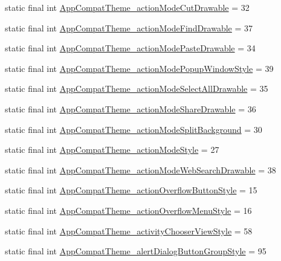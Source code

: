 \begin{CompactItemize}
\item 
static final int \hyperlink{classandroid_1_1support_1_1v4_1_1_r_1_1styleable_ff9fdface004857501db9de7aedb1dd6}{AppCompatTheme\_\-actionModeCutDrawable} = 32
\item 
static final int \hyperlink{classandroid_1_1support_1_1v4_1_1_r_1_1styleable_4c89f9a8ad7b10afd63ffd919b6c656d}{AppCompatTheme\_\-actionModeFindDrawable} = 37
\item 
static final int \hyperlink{classandroid_1_1support_1_1v4_1_1_r_1_1styleable_ce113ab232516420cf074243bfe9453f}{AppCompatTheme\_\-actionModePasteDrawable} = 34
\item 
static final int \hyperlink{classandroid_1_1support_1_1v4_1_1_r_1_1styleable_bcdd14cc5abf52a599a9a9d79cd848bd}{AppCompatTheme\_\-actionModePopupWindowStyle} = 39
\item 
static final int \hyperlink{classandroid_1_1support_1_1v4_1_1_r_1_1styleable_161a3ac1577d6c574603d52de21d3d13}{AppCompatTheme\_\-actionModeSelectAllDrawable} = 35
\item 
static final int \hyperlink{classandroid_1_1support_1_1v4_1_1_r_1_1styleable_5d3af33e63914f57419c77e882cafd0c}{AppCompatTheme\_\-actionModeShareDrawable} = 36
\item 
static final int \hyperlink{classandroid_1_1support_1_1v4_1_1_r_1_1styleable_5e9c280564e789966ff3d14b724504a1}{AppCompatTheme\_\-actionModeSplitBackground} = 30
\item 
static final int \hyperlink{classandroid_1_1support_1_1v4_1_1_r_1_1styleable_7b9d118860f9039d760ed5c14bc0d23c}{AppCompatTheme\_\-actionModeStyle} = 27
\item 
static final int \hyperlink{classandroid_1_1support_1_1v4_1_1_r_1_1styleable_bfa14a297ea509f8f84881a8e67711b1}{AppCompatTheme\_\-actionModeWebSearchDrawable} = 38
\item 
static final int \hyperlink{classandroid_1_1support_1_1v4_1_1_r_1_1styleable_37abdbb58ba6784cee7b4db7074bb2d4}{AppCompatTheme\_\-actionOverflowButtonStyle} = 15
\item 
static final int \hyperlink{classandroid_1_1support_1_1v4_1_1_r_1_1styleable_a866c80182ecc37a2b36bd4b28132297}{AppCompatTheme\_\-actionOverflowMenuStyle} = 16
\item 
static final int \hyperlink{classandroid_1_1support_1_1v4_1_1_r_1_1styleable_69fd4d038df58587b69f6986d49ed8c1}{AppCompatTheme\_\-activityChooserViewStyle} = 58
\item 
static final int \hyperlink{classandroid_1_1support_1_1v4_1_1_r_1_1styleable_00941c54362f2db3092824ceb3be22dd}{AppCompatTheme\_\-alertDialogButtonGroupStyle} = 95

\end{CompactItemize}
